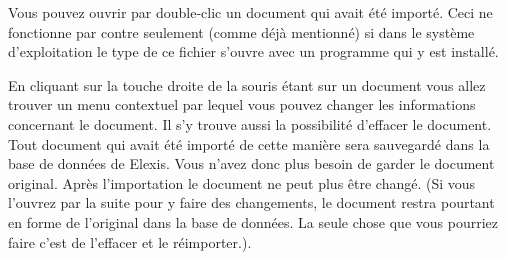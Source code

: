 Vous pouvez ouvrir par double-clic un document qui avait été importé. Ceci ne fonctionne par contre seulement (comme déjà mentionné) si dans le système d'exploitation le type de ce fichier s'ouvre avec un programme qui y est installé. 

En cliquant sur la touche droite de la souris étant sur un document vous allez trouver un menu contextuel par lequel vous pouvez changer les informations concernant le document. Il s'y trouve aussi la possibilité d'effacer le document.  
Tout document qui avait été importé de cette manière sera sauvegardé dans la base de données de Elexis. Vous n'avez donc plus besoin de garder le document original. Après l'importation le document ne peut plus être changé. (Si vous l'ouvrez par la suite pour y faire des changements, le document restra pourtant en forme de l'original dans la base de données. La seule chose que vous pourriez faire c'est de l'effacer et le réimporter.).



